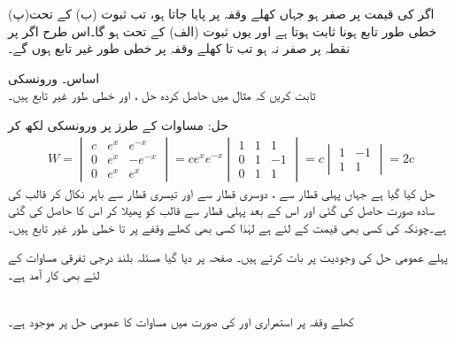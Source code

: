 (پ)\quad اگر  کی قیمت  پر صفر ہو جہاں  کھلے وقفہ  پر پایا جاتا ہو، تب ثبوت (ب) کے تحت خطی طور تابع ہونا ثابت ہوتا ہے اور یوں ثبوت (الف) کے تحت  ہو گا۔اس طرح اگر  پر نقطہ  پر  صفر نہ ہو تب  تا  کھلے وقفہ  پر خطی طور غیر تابع ہوں گے۔

 \quad اساس۔ ورونسکی\\
ثابت کریں کہ مثال  میں حاصل کردہ حل ،  اور  خطی طور غیر تابع ہیں۔

حل: مساوات  کے طرز پر  ورونسکی لکھ کر
\begin{align*}
W=
\begin{vmatrix}
c& e^x& e^{-x}\\
0& e^x & -e^{-x}\\
0&e^x&e^x
\end{vmatrix}
=c e^{x} e^{-x}
\begin{vmatrix}
1& 1& 1\\
0& 1 & -1\\
0&1&1
\end{vmatrix}=
c
\begin{vmatrix}
1& -1\\
1&1
\end{vmatrix}
=2c
\end{align*}
حل کیا گیا ہے جہاں پہلی قطار سے ، دوسری قطار سے  اور تیسری قطار سے  باہر نکال کر قالب کی سادہ صورت حاصل کی گئی اور اس کے بعد پہلی قطار سے قالب کو پھیلا کر اس کا  حاصل کی گئی ہے۔چونکہ  کی کسی بھی قیمت کے لئے   ہے لہٰذا کسی بھی کھلے وقفے پر  تا  خطی طور غیر تابع ہیں۔

پہلے عمومی حل کی وجودیت پر بات کرتے ہیں۔ صفحہ  پر دیا گیا مسئلہ  بلند درجی تفرقی مساوات کے لئے بھی کار آمد ہے۔

\\
کھلے وقفہ  پر استمراری  اور  کی صورت میں مساوات  کا عمومی حل  پر موجود ہے۔

